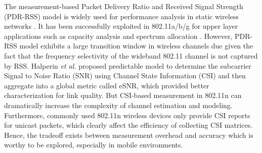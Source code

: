 \documentclass[draftclsnofoot,journal,onecolumn,11pt]{IEEEtran}
\begin{document}
The measurement-based Packet Delivery Ratio and Received Signal Strength (PDR-RSS) model is widely used for performance analysis in static wireless networks \cite{reis2006model}. It has been successfully exploited in 802.11a/b/g for upper layer applications such as capacity analysis \cite{kashyap2007capacity} and spectrum allocation \cite{k.rayanchu:fluid:}. However, PDR-RSS model exhibits a large transition window in wireless channels due given the fact that the frequency selectivity of the wideband 802.11 channel is not captured by RSS. Halperin \textit{et al.} \cite{Halperin2010predictable} proposed predictable model to determine the subcarrier Signal to Noise Ratio (SNR) using Channel State Information (CSI) and then aggregate into a global metric called eSNR, which provided better characterization for link quality. But CSI-based measurement in 802.11n can dramatically increase the complexity of channel estimation and modeling. Furthermore, commonly used 802.11n wireless devices only provide CSI reports for unicast packets, which clearly affect the efficiency of collecting CSI matrices. Hence, the tradeoff exists between measurement overhead and accuracy which is worthy to be explored, especially in mobile environments.
\end{document}
